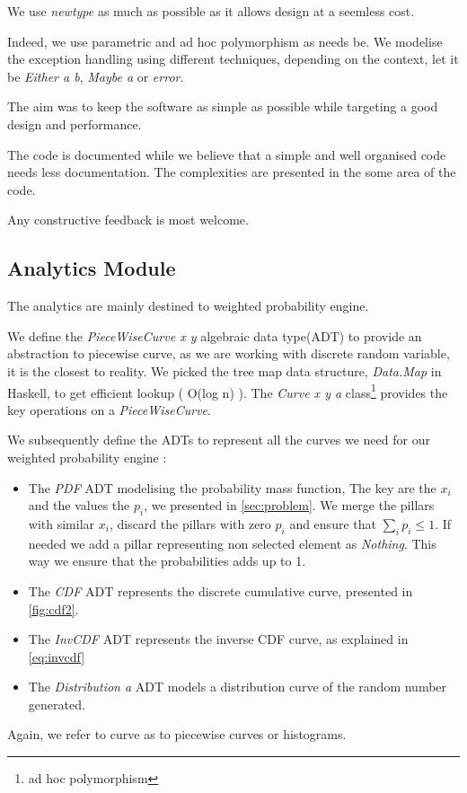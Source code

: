 \documentclass[12pt,a4paper,titlepage]{article}
\begin{document}
We use \emph{newtype} as much as possible as it allows design at a 
seemless cost.

Indeed, we use parametric and ad hoc polymorphism as needs be.
We modelise the exception handling using different techniques, depending on
the context, let it be \emph{Either a b}, \emph{Maybe a} or \emph{error}. 

The aim was to keep the software as simple as possible while targeting a
good design and performance. 

The code is documented while we believe that a simple and well organised
code needs less documentation. The complexities are presented in the some
area of the code. 

Any constructive feedback is most welcome.

\subsection{Analytics Module}

The analytics are mainly destined to weighted probability engine.

We define the \emph{PieceWiseCurve x y} algebraic data type(ADT) to provide an
abstraction to piecewise curve, as we are working with discrete
random variable, it is the closest to reality. We picked the tree map data
structure, \emph{Data.Map} in Haskell, to get efficient lookup ( O(log n) ).
The \emph{Curve x y a} class\footnote{ad hoc polymorphism} 
provides the key operations on a 
\emph{PieceWiseCurve}.  

We subsequently define the ADTs to represent all the curves we need
for our weighted probability engine :
\begin{itemize}
	\item The \emph{PDF} ADT modelising the probability mass function,
	The key are the $x_i$ and the values the $p_i$, we presented in
	\autoref{sec:problem}.
	We merge the pillars with similar $x_i$, discard the pillars with zero
	$p_i$ and ensure that $\sum_i p_i \leq 1$.
	If needed we add a pillar representing non selected element 
	as \emph{Nothing}. This way we ensure that the probabilities
	adds up to 1.
	\item The \emph{CDF} ADT represents the discrete cumulative
	curve, presented in \autoref{fig:cdf2}.
	\item The \emph{InvCDF} ADT represents the inverse CDF curve,
	as explained in \autoref{eq:invcdf}
	\item The \emph{Distribution a} ADT models a distribution curve
	of the random number generated.
\end{itemize}
Again, we refer to curve as to piecewise curves or histograms.
\end{document}
